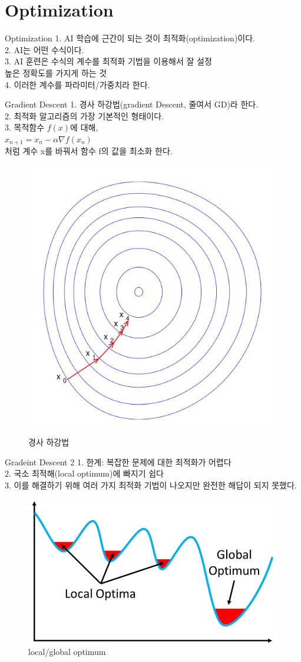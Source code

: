 \documentclass{beamer}
\begin{document}
\section{Optimization}
\begin{frame}{Optimization}
    1. AI 학습에 근간이 되는 것이 최적화(optimization)이다.\\
    2. AI는 어떤 수식이다.\\
    3. AI 훈련은 수식의 계수를 최적화 기법을 이용해서 잘 설정\\ 높은 정확도를 가지게 하는 것\\
    4. 이러한 계수를 파라미터/가중치라 한다.
\end{frame}

\begin{frame}{Gradient Descent}
    1. 경사 하강법(gradient Descent, 줄여서 GD)라 한다.\\
    2. 최적화 알고리즘의 가장 기본적인 형태이다. \\
    3. 목적함수 $f(x)$에 대해,\\
    $x_{n+1}=x_{n}-\alpha\nabla f(x_{n})$\\
    처럼 계수 x를 바꿔서 함수 f의 값을 최소화 한다.\\
    \begin{figure}
        \centering
        \includegraphics[width=0.3\linewidth]{Images/gradient.png}
        \caption{경사 하강법}
        \label{fig:gradient descent}
    \end{figure}
\end{frame}
\begin{frame}{Gradeint Descent 2}
    1. 한계: 복잡한 문제에 대한 최적화가 어렵다\\
    2. 국소 최적해(local optimum)에 빠지기 쉽다\\
    3. 이를 해결하기 위해 여러 가지 최적화 기법이 나오지만 완전한 해답이 되지 못했다.\\
    
\begin{figure}
    \centering
    \includegraphics[width=0.5\linewidth]{Images/local.png}
    \caption{local/global optimum}
    \label{fig:local/global optimum}
\end{figure}
\end{frame}
\end{document}
